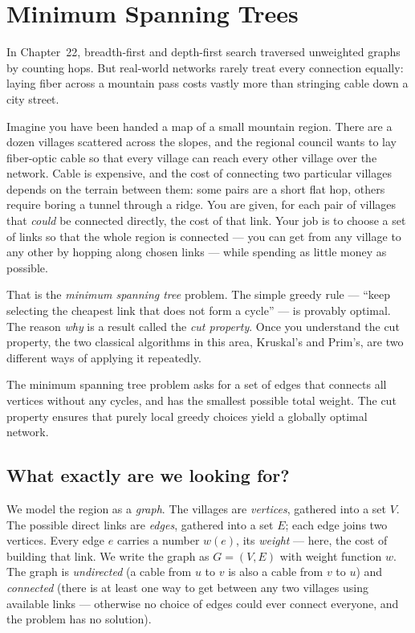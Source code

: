 \chapter{Minimum Spanning Trees}

In Chapter~22, breadth-first and depth-first search traversed unweighted graphs by counting hops. But real-world networks rarely treat every connection equally: laying fiber across a mountain pass costs vastly more than stringing cable down a city street.

Imagine you have been handed a map of a small mountain region. There are a dozen
villages scattered across the slopes, and the regional council wants to lay
fiber-optic cable so that every village can reach every other village over the
network. Cable is expensive, and the cost of connecting two particular villages
depends on the terrain between them: some pairs are a short flat hop, others
require boring a tunnel through a ridge. You are given, for each pair of villages
that \emph{could} be connected directly, the cost of that link. Your job is to
choose a set of links so that the whole region is connected --- you can get from
any village to any other by hopping along chosen links --- while spending as
little money as possible.

That is the \emph{minimum spanning tree} problem. The simple greedy rule ---
``keep selecting the cheapest link that does not form a cycle'' --- is provably
optimal. The reason \emph{why} is a result called the \emph{cut property}. Once you
understand the cut property, the two classical algorithms in this area, Kruskal's
and Prim's, are two different ways of applying it repeatedly.

\begin{focusbox}
The minimum spanning tree problem asks for a set of edges that connects all vertices without any cycles, and has the smallest possible total weight. The cut property ensures that purely local greedy choices yield a globally optimal network.
\end{focusbox}

\section{What exactly are we looking for?}

We model the region as a \emph{graph}. The villages are \emph{vertices}, gathered into a set $V$. The
possible direct links are \emph{edges}, gathered into a set $E$; each edge joins
two vertices. Every edge $e$ carries a number $w(e)$, its \emph{weight} --- here,
the cost of building that link. We write the graph as $G=(V,E)$ with weight
function $w$. The graph is \emph{undirected} (a cable from $u$ to $v$ is also a
cable from $v$ to $u$) and \emph{connected} (there is at least one way to get
between any two villages using available links --- otherwise no choice of edges
could ever connect everyone, and the problem has no solution).

